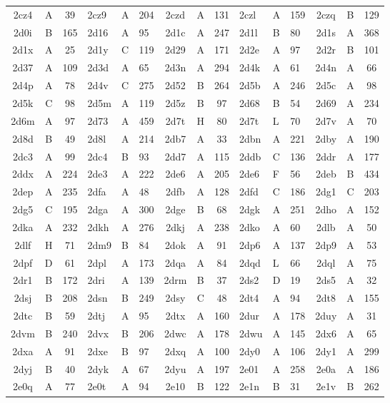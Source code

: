 \begin{longtable}{|c|c|c| a|a|a| c|c|c| a|a|a| c|c|c|}
2cz4 & A & 39 & 2cz9 & A & 204 & 2czd & A & 131 & 2czl & A & 159 & 2czq & B & 129\\
2d0i & B & 165 & 2d16 & A & 95 & 2d1c & A & 247 & 2d1l & B & 80 & 2d1s & A & 368\\
2d1x & A & 25 & 2d1y & C & 119 & 2d29 & A & 171 & 2d2e & A & 97 & 2d2r & B & 101\\
2d37 & A & 109 & 2d3d & A & 65 & 2d3n & A & 294 & 2d4k & A & 61 & 2d4n & A & 66\\
2d4p & A & 78 & 2d4v & C & 275 & 2d52 & B & 264 & 2d5b & A & 246 & 2d5c & A & 98\\
2d5k & C & 98 & 2d5m & A & 119 & 2d5z & B & 97 & 2d68 & B & 54 & 2d69 & A & 234\\
2d6m & A & 97 & 2d73 & A & 459 & 2d7t & H & 80 & 2d7t & L & 70 & 2d7v & A & 70\\
2d8d & B & 49 & 2d8l & A & 214 & 2db7 & A & 33 & 2dbn & A & 221 & 2dby & A & 190\\
2dc3 & A & 99 & 2dc4 & B & 93 & 2dd7 & A & 115 & 2ddb & C & 136 & 2ddr & A & 177\\
2ddx & A & 224 & 2de3 & A & 222 & 2de6 & A & 205 & 2de6 & F & 56 & 2deb & B & 434\\
2dep & A & 235 & 2dfa & A & 48 & 2dfb & A & 128 & 2dfd & C & 186 & 2dg1 & C & 203\\
2dg5 & C & 195 & 2dga & A & 300 & 2dge & B & 68 & 2dgk & A & 251 & 2dho & A & 152\\
2dka & A & 232 & 2dkh & A & 276 & 2dkj & A & 238 & 2dko & A & 60 & 2dlb & A & 50\\
2dlf & H & 71 & 2dm9 & B & 84 & 2dok & A & 91 & 2dp6 & A & 137 & 2dp9 & A & 53\\
2dpf & D & 61 & 2dpl & A & 173 & 2dqa & A & 84 & 2dqd & L & 66 & 2dql & A & 75\\
2dr1 & B & 172 & 2dri & A & 139 & 2drm & B & 37 & 2ds2 & D & 19 & 2ds5 & A & 32\\
2dsj & B & 208 & 2dsn & B & 249 & 2dsy & C & 48 & 2dt4 & A & 94 & 2dt8 & A & 155\\
2dtc & B & 59 & 2dtj & A & 95 & 2dtx & A & 160 & 2dur & A & 178 & 2duy & A & 31\\
2dvm & B & 240 & 2dvx & B & 206 & 2dwc & A & 178 & 2dwu & A & 145 & 2dx6 & A & 65\\
2dxa & A & 91 & 2dxe & B & 97 & 2dxq & A & 100 & 2dy0 & A & 106 & 2dy1 & A & 299\\
2dyj & B & 40 & 2dyk & A & 67 & 2dyu & A & 197 & 2e01 & A & 258 & 2e0a & A & 186\\
2e0q & A & 77 & 2e0t & A & 94 & 2e10 & B & 122 & 2e1n & B & 31 & 2e1v & B & 262\\

\end{longtable}
